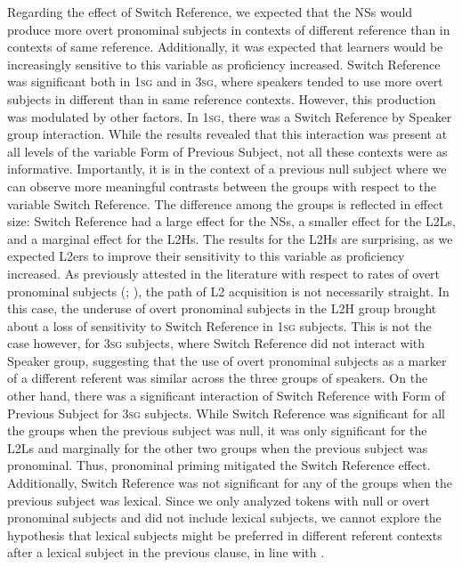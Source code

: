 \documentclass[output=paper,colorlinks,citecolor=brown,draftmode]{langscibook}
\begin{document}
Regarding the effect of Switch Reference, we expected that the NSs would produce more overt pronominal subjects in contexts of different reference than in contexts of same reference. Additionally, it was expected that learners would be increasingly sensitive to this variable as proficiency increased. Switch Reference was significant both in 1\textsc{sg} and in 3\textsc{sg}, where speakers tended to use more overt subjects in different than in same reference contexts. However, this production was modulated by other factors. In 1\textsc{sg}, there was a Switch Reference by Speaker group interaction. While the results revealed that this interaction was present at all levels of the variable Form of Previous Subject, not all these contexts were as informative. Importantly, it is in the context of a previous null subject where we can observe more meaningful contrasts between the groups with respect to the variable Switch Reference. The difference among the groups is reflected in effect size: Switch Reference had a large effect for the NSs, a smaller effect for the L2Ls, and a marginal effect for the L2Hs. The results for the L2Hs are surprising, as we expected L2ers to improve their sensitivity to this variable as proficiency increased. As previously attested in the literature with respect to rates of overt pronominal subjects (\citealp{GeeslinDíaz-Campos2013}; \citealp{GeeslinFafulas2015}), the path of L2 acquisition is not necessarily straight. In this case, the underuse of overt pronominal subjects in the L2H group brought about a loss of sensitivity to Switch Reference in 1\textsc{sg} subjects. This is not the case however, for 3\textsc{sg} subjects, where Switch Reference did not interact with Speaker group, suggesting that the use of overt pronominal subjects as a marker of a different referent was similar across the three groups of speakers. On the other hand, there was a significant interaction of Switch Reference with Form of Previous Subject for 3\textsc{sg} subjects. While Switch Reference was significant for all the groups when the previous subject was null, it was only significant for the L2Ls and marginally for the other two groups when the previous subject was pronominal. Thus, pronominal priming mitigated the Switch Reference effect. Additionally, Switch Reference was not significant for any of the groups when the previous subject was lexical. Since we only analyzed tokens with null or overt pronominal subjects and did not include lexical subjects, we cannot explore the hypothesis that lexical subjects might be preferred in different referent contexts after a lexical subject in the previous clause, in line with \citet[256]{Lozano2016}.
\end{document}
